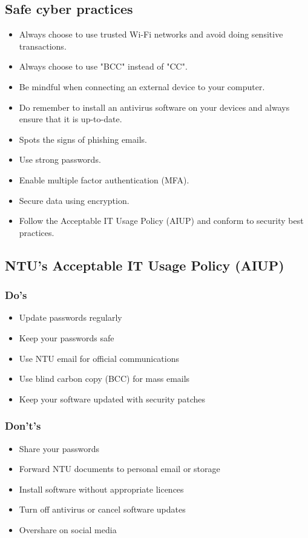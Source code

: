 \documentclass[11pt]{article}
\begin{document}
\subsection{Safe cyber practices}
\label{sec:org32025a0}
\begin{itemize}
\item Always choose to use trusted Wi-Fi networks and avoid doing sensitive transactions.
\item Always choose to use "BCC" instead of "CC".
\item Be mindful when connecting an external device to your computer.
\item Do remember to install an antivirus software on your devices and always ensure that it is up-to-date.
\item Spots the signs of phishing emails.
\item Use strong passwords.
\item Enable multiple factor authentication (MFA).
\item Secure data using encryption.
\item Follow the Acceptable IT Usage Policy (AIUP) and conform to security best practices.
\end{itemize}
\subsection{NTU's Acceptable IT Usage Policy (AIUP)}
\label{sec:org4d7fa05}

\subsubsection{Do's}
\label{sec:orgee17530}
\begin{itemize}
\item Update passwords regularly
\item Keep your passwords safe
\item Use NTU email for official communications
\item Use blind carbon copy (BCC) for mass emails
\item Keep your software updated with security patches
\end{itemize}
\subsubsection{Don't's}
\label{sec:orgaea5dc8}
\begin{itemize}
\item Share your passwords
\item Forward NTU documents to personal email or storage
\item Install software without appropriate licences
\item Turn off antivirus or cancel software updates
\item Overshare on social media
\end{itemize}
\end{document}
